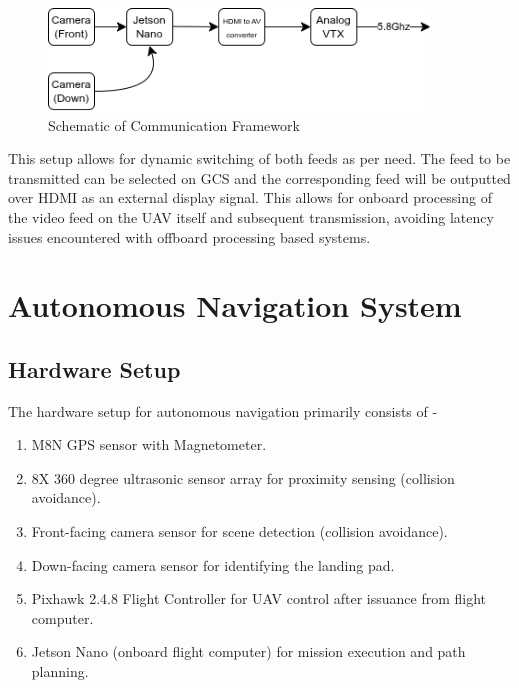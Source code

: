 \documentclass[12pt]{report}
\begin{document}
        \begin{figure}[H]
          \centering 
          \includegraphics[width=0.9\textwidth]{2D_schematic.png}
          \caption{Schematic of Communication Framework}
          \label{fig:framework}
        \end{figure}
    \noindent This setup allows for dynamic switching of both feeds as per need. The feed to be transmitted can be selected on GCS and the corresponding feed will be outputted over HDMI as an external display signal. This allows for onboard processing of the video feed on the UAV itself and subsequent transmission, avoiding latency issues encountered with offboard processing based systems.

    \newpage
    \section{Autonomous Navigation System}
      \subsection{Hardware Setup}
      The hardware setup for autonomous navigation primarily consists of -
      \begin{enumerate}
        \item M8N GPS sensor with Magnetometer.
        \item 8X 360 degree ultrasonic sensor array for proximity sensing (collision avoidance).
        \item Front-facing camera sensor for scene detection (collision avoidance).
        \item Down-facing camera sensor for identifying the landing pad.
        \item Pixhawk 2.4.8 Flight Controller for UAV control after issuance from flight computer.
        \item Jetson Nano (onboard flight computer) for mission execution and path planning.
      \end{enumerate}
\end{document}
